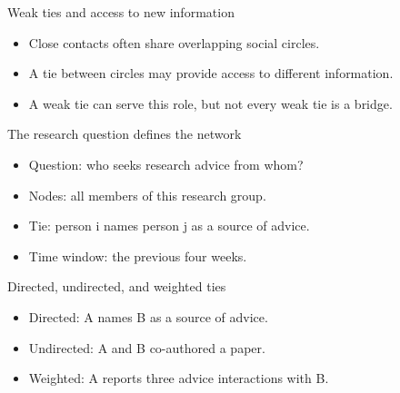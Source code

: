 \documentclass[aspectratio=169,11pt]{beamer}
\begin{document}
\begin{frame}{Weak ties and access to new information}
\begin{itemize}
\item Close contacts often share overlapping social circles.
\medskip
\item A tie between circles may provide access to different information.
\medskip
\item A weak tie can serve this role, but not every weak tie is a bridge.
\medskip
\end{itemize}

\end{frame}

\begin{frame}{The research question defines the network}
\begin{itemize}
\item Question: who seeks research advice from whom?
\medskip
\item Nodes: all members of this research group.
\medskip
\item Tie: person i names person j as a source of advice.
\medskip
\item Time window: the previous four weeks.
\medskip
\end{itemize}

\end{frame}

\begin{frame}{Directed, undirected, and weighted ties}
\begin{itemize}
\item Directed: A names B as a source of advice.
\medskip
\item Undirected: A and B co-authored a paper.
\medskip
\item Weighted: A reports three advice interactions with B.
\medskip
\end{itemize}

\end{frame}
\end{document}
